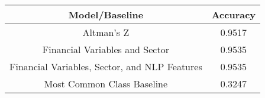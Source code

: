 \footnotesize
\begin{tabular}{cc}
\toprule
Model/Baseline & Accuracy \\
\midrule
Altman's Z & 0.9517 \\
Financial Variables and Sector & 0.9535 \\
Financial Variables, Sector, and NLP Features & 0.9535 \\
Most Common Class Baseline & 0.3247 \\
\bottomrule
\end{tabular}

\normalsize